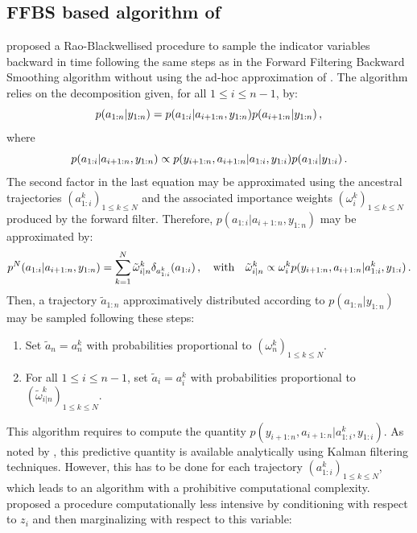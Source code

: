 \subsection{FFBS based algorithm of \cite{lindsten:bunch:sarkka:schon:godsill:2015,sarkka:bunch:godsill:2012,lindsten:bunch:godsill:schon:2013}}
\cite{lindsten:bunch:sarkka:schon:godsill:2015,sarkka:bunch:godsill:2012,lindsten:bunch:godsill:schon:2013} proposed a Rao-Blackwellised procedure to sample the indicator variables backward in time following the same steps as in the Forward Filtering Backward Smoothing algorithm \cite{huerzeler:kunsch:1998,doucet:godsill:andrieu:2000} without using the ad-hoc approximation of \cite{kim:1994}. The algorithm relies on the decomposition given, for all $1\le i \le n-1$, by:
\[
p(a_{1:n}|y_{1:n}) = p(a_{1:i}|a_{i+1:n},y_{1:n})p(a_{i+1:n}|y_{1:n})\,,
\]
where
\[
p(a_{1:i}|a_{i+1:n},y_{1:n}) \propto p(y_{i+1:n},a_{i+1:n}|a_{1:i},y_{1:i})p(a_{1:i}|y_{1:i})\,.
\]
The second factor in the last equation may be approximated using the ancestral  trajectories $(a^k_{1:i})_{1\le k \le N}$ and the associated importance weights $(\omega^k_{i})_{1\le k \le N}$ produced by the forward filter. Therefore, $p(a_{1:i}|a_{i+1:n},y_{1:n})$ may be approximated by:
\[
p^N(a_{1:i}|a_{i+1:n},y_{1:n}) = \sum_{k=1}^N \tilde{\omega}^k_{i|n}\delta_{a^k_{1:i}}(a_{1:i})\,, \quad \text{with} \quad \tilde{\omega}^k_{i|n} \propto \omega_i^k p(y_{i+1:n},a_{i+1:n}|a^k_{1:i},y_{1:i}) \,. 
\]
Then, a trajectory $\tilde{a}_{1:n}$ approximatively distributed according to $p(a_{1:n}|y_{1:n})$ may be sampled following these steps:
\begin{enumerate}[-]
\item Set $\tilde{a}_n= a_n^k$ with probabilities proportional to $(\omega_n^k)_{1\le k \le N}$.
\item For all $1\le i\le n-1$, set $\tilde{a}_i = a_i^k$ with probabilities proportional to $(\tilde{\omega}_{i|n}^k)_{1\le k \le N}$.
\end{enumerate}
This algorithm requires to compute the quantity  $p(y_{i+1:n},a_{i+1:n}|a^k_{1:i},y_{1:i})$. As noted by \cite{lindsten:bunch:sarkka:schon:godsill:2015}, this predictive quantity is available analytically using  Kalman filtering techniques. However, this has to be done for each trajectory $(a^k_{1:i})_{1\le k \le N}$, which leads to an algorithm with a prohibitive computational complexity. \cite{lindsten:bunch:sarkka:schon:godsill:2015} proposed a procedure computationally less intensive by conditioning with respect to $z_i$ and then marginalizing with respect to this variable:

